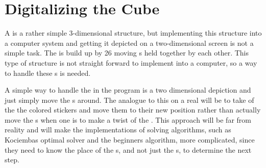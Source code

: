 \chapter{Digitalizing the Cube}
A \rubik{} is a rather simple 3-dimensional structure, but implementing this structure into a computer system and getting it depicted on a two-dimensional screen is not a simple task.
The \rubik{} is build up by 26 moving \cpiece{}s held together by each other.  This type of structure is not straight forward to implement into a computer, so a way to handle these \cpiece{}s is needed.

A simple way to handle the \rubik{} in the program is a two dimensional depiction and  just simply move the \facelet{}s around.
The analogue to this on a real \rubik{} will be to take of the the colored stickers and move them to their new position rather than actually move the \cubie{}s when one is to make a twist of the \rubik{}.
This approach will be far from reality and will make the implementations of solving algorithms, such as Kociembas optimal solver and the beginners algorithm, more complicated, since they need to know the place of the \cpiece{}s, and not just the \facelet{}s, to determine the next step.

